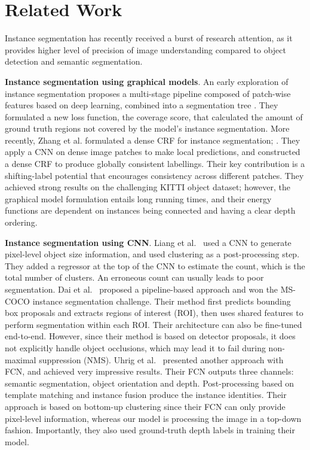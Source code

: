 \section{Related Work}

Instance segmentation has recently received a burst of research attention, as
it provides higher level of precision of image understanding compared to object
detection and semantic segmentation.

\textbf{Instance segmentation using graphical models}. An early exploration of
instance segmentation proposes a multi-stage pipeline composed of patch-wise
features based on deep learning, combined into a segmentation tree
\cite{silberman14insseg}. They formulated a new loss function, the coverage
score, that calculated the amount of ground truth regions not covered by the
model's instance segmentation. More recently, Zhang et al. \cite{zhang16insseg}
formulated a dense CRF for instance segmentation; .  They apply a CNN on dense
image patches to make local predictions, and constructed a dense CRF to produce
globally consistent labellings. Their key contribution is a shifting-label
potential that encourages consistency across different patches. They achieved
strong results on the challenging KITTI object dataset; however, the graphical
model formulation entails long running times, and their energy functions are
dependent on instances being connected and having a clear depth ordering.

\textbf{Instance segmentation using CNN}. Liang et al.~\cite{liang15pfinsseg}
used a CNN to generate pixel-level object size information, and used clustering
as a post-processing step. They added a regressor at the top of the CNN to
estimate the count, which is the total number of clusters. An erroneous count
can usually leads to poor segmentation. Dai et al.~\cite{dai15insaware}
proposed a pipeline-based approach and won the MS-COCO instance segmentation
challenge. Their method first predicts bounding box proposals and extracts
regions of interest (ROI), then uses shared features to perform segmentation
within each ROI. Their architecture can also be fine-tuned end-to-end. However,
since their method is based on detector proposals, it does not explicitly
handle object occlusions, which may lead it to fail during  non- maximal
suppression (NMS). Uhrig et al.~\cite{uhrig16insseg} presented another approach
with FCN, and achieved very impressive results. Their FCN outputs three
channels: semantic segmentation, object orientation and depth. Post-processing
based on template matching and instance fusion produce the instance identities.
Their approach is based on bottom-up clustering since their FCN can only
provide pixel-level information, whereas our model is processing the image in a
top-down fashion. Importantly, they also used ground-truth depth labels in
training their model.

